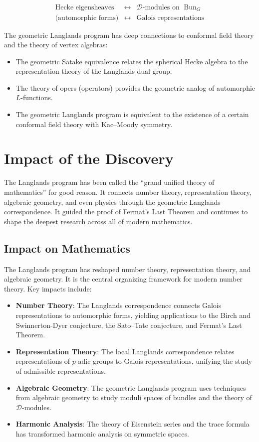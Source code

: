 \[
\begin{array}{ccc}
\text{Hecke eigensheaves} & \longleftrightarrow & \text{$\mathcal{D}$-modules on $\operatorname{Bun}_G$} \\
\text{(automorphic forms)} & \longleftrightarrow & \text{Galois representations}
\end{array}
\]

The geometric Langlands program has deep connections to conformal field theory and the theory of vertex algebras:
\begin{itemize}
\item The geometric Satake equivalence relates the spherical Hecke algebra to the representation theory of the Langlands dual group.
\item The theory of opers (operators) provides the geometric analog of automorphic $L$-functions.
\item The geometric Langlands program is equivalent to the existence of a certain conformal field theory with Kac--Moody symmetry.
\end{itemize}

\section{Impact of the Discovery}

\begin{whyitmatters}
The Langlands program has been called the ``grand unified theory of
mathematics'' for good reason. It connects number theory, representation
theory, algebraic geometry, and even physics through the geometric
Langlands correspondence. It guided the proof of Fermat's Last Theorem
and continues to shape the deepest research across all of modern
mathematics.
\end{whyitmatters}

\subsection{Impact on Mathematics}

The Langlands program has reshaped number theory, representation theory, and algebraic geometry. It is the central organizing framework for modern number theory. Key impacts include:
\begin{itemize}
\item \textbf{Number Theory}: The Langlands correspondence connects Galois representations to automorphic forms, yielding applications to the Birch and Swinnerton-Dyer conjecture, the Sato--Tate conjecture, and Fermat's Last Theorem.
\item \textbf{Representation Theory}: The local Langlands correspondence relates representations of $p$-adic groups to Galois representations, unifying the study of admissible representations.
\item \textbf{Algebraic Geometry}: The geometric Langlands program uses techniques from algebraic geometry to study moduli spaces of bundles and the theory of $\mathcal{D}$-modules.
\item \textbf{Harmonic Analysis}: The theory of Eisenstein series and the trace formula has transformed harmonic analysis on symmetric spaces.
\end{itemize}

